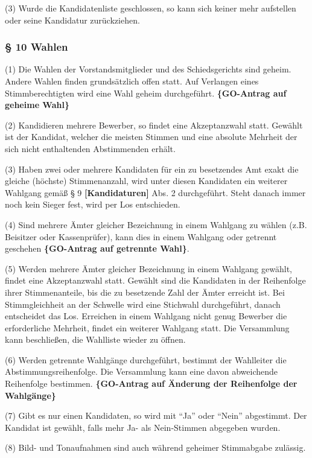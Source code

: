 (3) Wurde die Kandidatenliste geschlossen, so kann sich keiner mehr
aufstellen oder seine Kandidatur zurückziehen.

\subsubsection{§ 10 Wahlen}

(1) Die Wahlen der Vorstandsmitglieder und des Schiedsgerichts sind
geheim. Andere Wahlen finden grundsätzlich offen statt. Auf Verlangen
eines Stimmberechtigten wird eine Wahl geheim durchgeführt.
\textbf{\{GO-Antrag auf geheime Wahl\}}

(2) Kandidieren mehrere Bewerber, so findet eine Akzeptanzwahl statt.
Gewählt ist der Kandidat, welcher die meisten Stimmen und eine absolute
Mehrheit der sich nicht enthaltenden Abstimmenden erhält.

(3) Haben zwei oder mehrere Kandidaten für ein zu besetzendes Amt exakt
die gleiche (höchste) Stimmenanzahl, wird unter diesen Kandidaten ein
weiterer Wahlgang gemäß § 9 \textbf{{[}Kandidaturen{]}} Abs. 2
durchgeführt. Steht danach immer noch kein Sieger fest, wird per Los
entschieden.

(4) Sind mehrere Ämter gleicher Bezeichnung in einem Wahlgang zu wählen
(z.B. Beisitzer oder Kassenprüfer), kann dies in einem Wahlgang oder
getrennt geschehen \textbf{\{GO-Antrag auf getrennte Wahl\}}.

(5) Werden mehrere Ämter gleicher Bezeichnung in einem Wahlgang gewählt,
findet eine Akzeptanzwahl statt. Gewählt sind die Kandidaten in der
Reihenfolge ihrer Stimmenanteile, bis die zu besetzende Zahl der Ämter
erreicht ist. Bei Stimmgleichheit an der Schwelle wird eine Stichwahl
durchgeführt, danach entscheidet das Los. Erreichen in einem Wahlgang
nicht genug Bewerber die erforderliche Mehrheit, findet ein weiterer
Wahlgang statt. Die Versammlung kann beschließen, die Wahlliste wieder
zu öffnen.

(6) Werden getrennte Wahlgänge durchgeführt, bestimmt der Wahlleiter die
Abstimmungsreihenfolge. Die Versammlung kann eine davon abweichende
Reihenfolge bestimmen. \textbf{\{GO-Antrag auf Änderung der Reihenfolge
der Wahlgänge\}}

(7) Gibt es nur einen Kandidaten, so wird mit ``Ja'' oder ``Nein''
abgestimmt. Der Kandidat ist gewählt, falls mehr Ja- als Nein-Stimmen
abgegeben wurden.

(8) Bild- und Tonaufnahmen sind auch während geheimer Stimmabgabe
zulässig.

